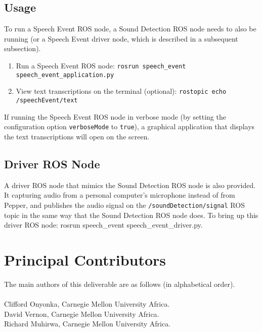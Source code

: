 \documentclass{CSSRforAfrica}
\newcommand{\blank}{~\\}
\begin{document}
\subsection{Usage}
To run a Speech Event ROS node, a Sound Detection ROS node needs to also be running (or a Speech Event driver node, which is described in a subsequent subsection).

\begin{enumerate}
    \item Run a Speech Event ROS node: \lstinline|rosrun speech_event speech_event_application.py|
    \item View text transcriptions on the terminal (optional): \lstinline|rostopic echo /speechEvent/text|
\end{enumerate}

If running the Speech Event ROS node in verbose mode (by setting the configuration option \texttt{verboseMode} to \texttt{true}), a graphical application that displays the text transcriptions will open on the screen.

\subsection{Driver ROS Node}
A driver ROS node that mimics the Sound Detection ROS node is also provided. It capturing audio from a personal computer's microphone instead of from Pepper, and publishes the audio signal on the \texttt{/soundDetection/signal} ROS topic in the same way that the Sound Detection ROS node does. To bring up this driver ROS node: rosrun speech\_event speech\_event\_driver.py.


\newpage




\pagebreak
\section*{Principal Contributors}
\label{contributors}
The main authors of this deliverable are as follows (in alphabetical order).
\blank
~
\blank
Clifford Onyonka, Carnegie Mellon University Africa.\\    %
David Vernon, Carnegie Mellon University Africa.\\    %
Richard Muhirwa, Carnegie Mellon University Africa.\\    %
\end{document}
